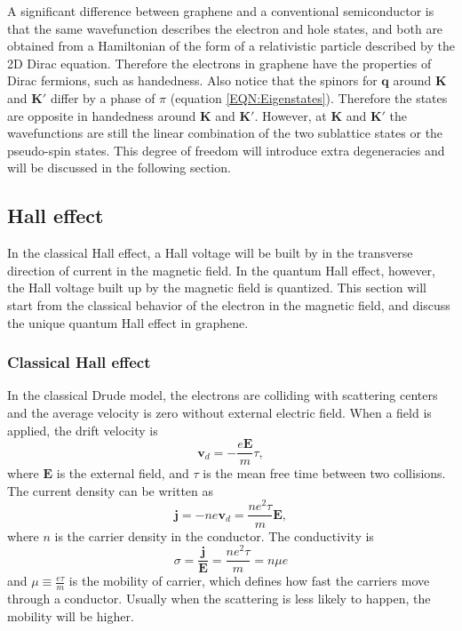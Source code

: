 \documentclass[pdflatex, sectionletters, 12pt]{pittetd}    %
\begin{document}
A significant difference between graphene and a conventional semiconductor is that the same wavefunction describes the electron and hole states, and both are obtained from a Hamiltonian of the form of a relativistic particle described by the 2D Dirac equation\cite{neto2009electronic}. Therefore the electrons in graphene have the properties of Dirac fermions, such as handedness. Also notice that the spinors for $\mathbf{q}$ around $\mathbf{K}$ and $\mathbf{K'}$ differ by a phase of $\pi$ (equation \ref{EQN:Eigenstates}). Therefore the states are opposite in handedness around $\mathbf{K}$ and $\mathbf{K'}$. However, at $\mathbf{K}$ and $\mathbf{K'}$ the wavefunctions are still the linear combination of the two sublattice states or the pseudo-spin states. This degree of freedom will introduce extra degeneracies and will be discussed in the following section.

\subsection{Hall effect}

In the classical Hall effect, a Hall voltage will be built by in the transverse direction of current in the magnetic field. In the quantum Hall effect, however, the Hall voltage built up by the magnetic field is quantized. This section will start from the classical behavior of the electron in the magnetic field, and discuss the unique quantum Hall effect in graphene.

\subsubsection{Classical Hall effect}

In the classical Drude model, the electrons are colliding with scattering centers and the average velocity is zero without external electric field. When a field is applied, the drift velocity is 
\begin{equation}
\mathbf{v}_d = -\frac{e\mathbf{E}}{m}\tau,
\label{EQN:ClassicalE}
\end{equation}
where $\mathbf{E}$ is the external field, and $\tau$ is the mean free time between two collisions. The current density can be written as 
$$\mathbf{j} = -ne\mathbf{v}_d = \frac{ne^2\tau}{m}\mathbf{E},$$
where $n$ is the carrier density in the conductor. The conductivity is 
\begin{equation}
\sigma = \frac{\mathbf{j}}{\mathbf{E}} = \frac{ne^2\tau}{m} = n\mu e
\label{EQN:Conductivity}
\end{equation}
and $\displaystyle \mu \equiv \frac{e\tau}{m}$ is the mobility of carrier, which defines how fast the carriers move through a conductor. Usually when the scattering is less likely to happen, the mobility will be higher.
\end{document}
